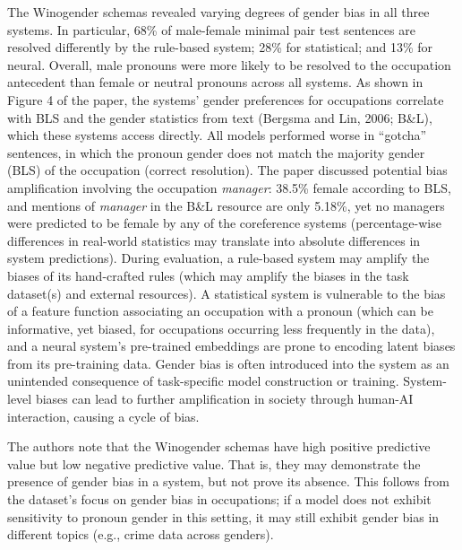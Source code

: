 \documentclass[11pt]{article}
\begin{document}
The Winogender schemas revealed varying degrees of gender bias 
in all three systems. In particular, 68\% of male-female minimal pair 
test sentences are resolved differently by the rule-based 
system; 28\% for statistical; and 13\% for neural. 
Overall, male pronouns were more likely to be resolved to 
the occupation antecedent than female or neutral pronouns across
all systems. As shown in Figure 4 of the paper, the systems' gender
preferences for occupations correlate with BLS
and the gender statistics from text (Bergsma and Lin, 2006; B\&L), which these systems access directly. 
All models performed worse in “gotcha” sentences, in which the pronoun gender does not match the 
majority gender (BLS) of the occupation (correct resolution).
The paper discussed potential bias amplification involving the occupation \textit{manager}: 
38.5\% female according to BLS, and mentions of
\textit{manager} in the B\&L resource are only 5.18\%, yet no managers 
were predicted to be female by any of the coreference systems (percentage-wise differences in real-world
statistics may translate into absolute differences
in system predictions). During evaluation, a rule-based system may amplify the biases of 
its hand-crafted rules (which may amplify the biases in the task dataset(s) and 
external resources). A statistical system is vulnerable to the bias 
of a feature function associating an occupation with a pronoun 
(which can be informative, yet biased, for
occupations occurring less frequently in the data),
and a neural system's pre-trained embeddings are prone to 
encoding latent biases from its pre-training data. 
Gender bias is often introduced into the system as 
an unintended consequence of task-specific model construction
or training. System-level biases can lead to further amplification 
in society through human-AI interaction, causing a cycle of bias. 

The authors note that the Winogender 
schemas have high positive predictive value but low negative predictive value. 
That is, they may demonstrate the presence of gender bias in a system, but not prove its absence.
This follows from the dataset's focus on gender bias in occupations; 
if a model does not exhibit sensitivity to pronoun gender in this setting, it may still exhibit gender
bias in different topics (e.g., crime data across genders). 
\end{document}

